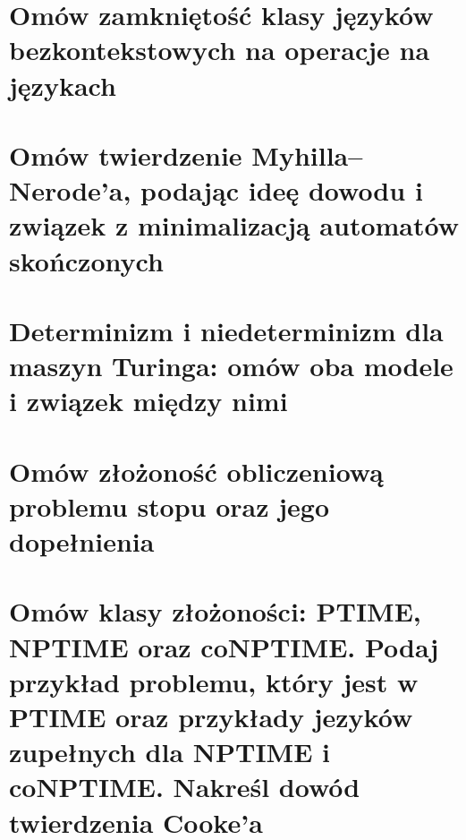 \section{Omów zamkniętość klasy języków bezkontekstowych na operacje na językach}


\section{Omów twierdzenie Myhilla–Nerode’a, podając ideę dowodu i związek z minimalizacją automatów skończonych}


\section{Determinizm i niedeterminizm dla maszyn Turinga: omów oba modele i związek
  między nimi}



\section{Omów złożoność obliczeniową problemu stopu oraz jego dopełnienia}


\section{Omów klasy złożoności: PTIME, NPTIME oraz coNPTIME. Podaj przykład
  problemu, który jest w PTIME oraz przykłady jezyków zupełnych dla NPTIME i coNPTIME.
  Nakreśl dowód twierdzenia Cooke’a}
